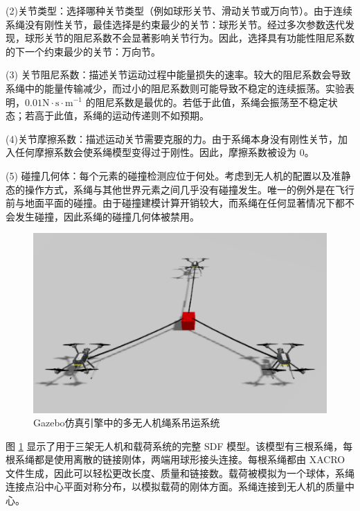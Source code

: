 \documentclass[lang=chs, degree=master, blindreview=true, winfonts=true]{yanputhesis}
\begin{document}
(2){关节类型}：选择哪种关节类型（例如球形关节、滑动关节或万向节）。由于连续系绳没有刚性关节，最佳选择是约束最少的关节：球形关节。经过多次参数迭代发现，球形关节的阻尼系数不会显著影响关节行为。因此，选择具有功能性阻尼系数的下一个约束最少的关节：万向节。
    
(3) {关节阻尼系数}：描述关节运动过程中能量损失的速率。较大的阻尼系数会导致系绳中的能量传输减少，而过小的阻尼系数则可能导致不稳定的连续振荡。实验表明，$0.01  \text {N}\cdot \text{s} \cdot \text{m}^{-1}$ 
的阻尼系数是最优的。若低于此值，系绳会振荡至不稳定状态；若高于此值，系绳的运动传递则不如预期。
    
(4){关节摩擦系数}：描述运动关节需要克服的力。由于系绳本身没有刚性关节，加入任何摩擦系数会使系绳模型变得过于刚性。因此，摩擦系数被设为 0。
    
(5) {碰撞几何体}：每个元素的碰撞检测应位于何处。考虑到无人机的配置以及准静态的操作方式，系绳与其他世界元素之间几乎没有碰撞发生。唯一的例外是在飞行前与地面平面的碰撞。由于碰撞建模计算开销较大，而系绳在任何显著情况下都不会发生碰撞，因此系绳的碰撞几何体被禁用。



\begin{figure}[hbt!]
	\centering
	\includegraphics[width=36pc]{picture/5_2.png} 
	\caption{Gazebo仿真引擎中的多无人机绳系吊运系统} 
	\label{5_2}
\end{figure}

图 \ref{5_2} 显示了用于三架无人机和载荷系统的完整 SDF 模型。该模型有三根系绳，每根系绳都是使用离散的链接刚体，两端用球形接头连接。每根系绳都由 XACRO 文件生成，因此可以轻松更改长度、质量和链接数。载荷被模拟为一个球体，系绳连接点沿中心平面对称分布，以模拟载荷的刚体方面。系绳连接到无人机的质量中心。
\end{document}
